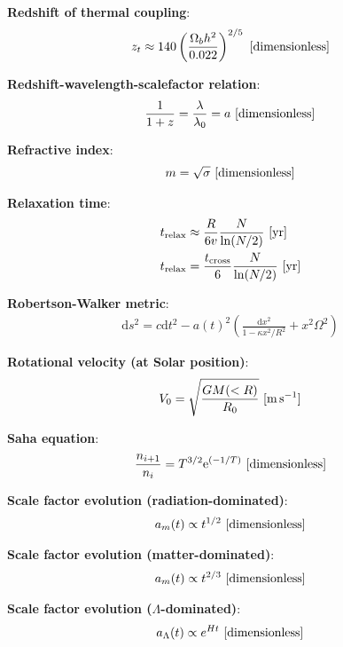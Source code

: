 \documentclass[a4paper,10pt]{article}
\begin{document}
{\noindent}\textbf{Redshift of thermal coupling}:
\begin{align*}
    z_t \approx 140\left(\frac{\Omega_bh^2}{0.022}\right)^{2/5} ~ [{\rm dimensionless}]
\end{align*}

{\noindent}\textbf{Redshift-wavelength-scalefactor relation}:
\begin{align*}
    \frac{1}{1+z} = \frac{\lambda}{\lambda_0} = a ~ [{\rm dimensionless}]
\end{align*}

{\noindent}\textbf{Refractive index}:
\begin{align*}
    m=\sqrt{\sigma} ~ [{\rm dimensionless}]
\end{align*}

{\noindent}\textbf{Relaxation time}:
\begin{align*}
    t_\mathrm{relax} &\approx \frac{R}{6v} \frac{N}{\ln(N/2)} ~ [{\rm yr}] \\
    t_\mathrm{relax} &= \frac{t_\mathrm{cross}}{6} \frac{N}{\ln(N/2)} ~ [{\rm yr}]
\end{align*}

{\noindent}\textbf{Robertson-Walker metric}:
\begin{align*}
    \mathrm{d}s^2 = c\mathrm{d}t^2 -a(t)^2 \left( \frac{\mathrm{d}x^2}{1-\kappa x^2/R^2} + x^2\Omega^2 \right)
\end{align*}

{\noindent}\textbf{Rotational velocity (at Solar position)}:
\begin{align*}
    V_0 = \sqrt{\frac{GM(<R)}{R_0}} ~ [{\rm m\,s^{-1}}]
\end{align*}

{\noindent}\textbf{Saha equation}:
\begin{align*}
    \frac{n_{i+1}}{n_i} = T^{3/2}\mathrm{e}^{(-1/T)} ~ [{\rm dimensionless}]
\end{align*}

{\noindent}\textbf{Scale factor evolution (radiation-dominated)}:
\begin{align*}
    a_m(t) \propto t^{1/2} ~ [{\rm dimensionless}]
\end{align*}

{\noindent}\textbf{Scale factor evolution (matter-dominated)}:
\begin{align*}
    a_m(t) \propto t^{2/3} ~ [{\rm dimensionless}]
\end{align*}

{\noindent}\textbf{Scale factor evolution ($\Lambda$-dominated)}:
\begin{align*}
    a_\Lambda(t) \propto e^{Ht} ~ [{\rm dimensionless}]
\end{align*}
\end{document}
